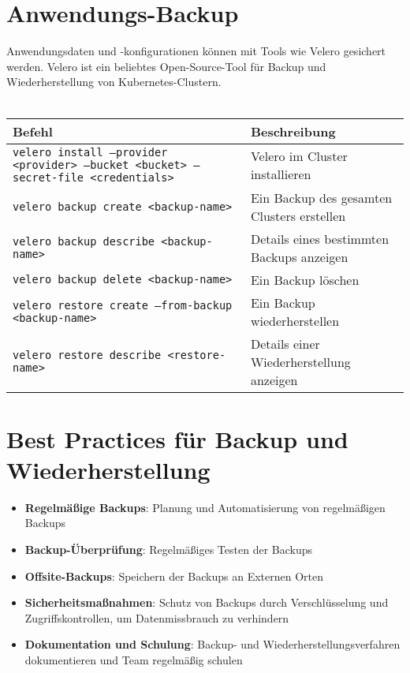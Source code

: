 \section{Anwendungs-Backup}
Anwendungsdaten und -konfigurationen können mit Tools wie Velero gesichert werden. Velero ist ein beliebtes Open-Source-Tool für Backup und Wiederherstellung von Kubernetes-Clustern.\\
\phantom{.}\\
\begin{tabular}{|p{}|p{}|}
\hline
\textbf{Befehl} & \textbf{Beschreibung} \\
\hline
\texttt{velero install --provider <provider> --bucket <bucket> --secret-file <credentials>} & Velero im Cluster installieren \\
\texttt{velero backup create <backup-name>} & Ein Backup des gesamten Clusters erstellen \\
\texttt{velero backup describe <backup-name>} & Details eines bestimmten Backups anzeigen \\
\texttt{velero backup delete <backup-name>} & Ein Backup löschen \\
\texttt{velero restore create --from-backup <backup-name>} & Ein Backup wiederherstellen \\
\texttt{velero restore describe <restore-name>} & Details einer Wiederherstellung anzeigen \\
\hline
\end{tabular}
\newpage
\section{Best Practices für Backup und Wiederherstellung}
\begin{itemize}
    \item \textbf{Regelmäßige Backups}: Planung und Automatisierung von regelmäßigen Backups
    \item \textbf{Backup-Überprüfung}: Regelmäßiges Testen der Backups
    \item \textbf{Offsite-Backups}: Speichern der Backups an Externen Orten
    \item \textbf{Sicherheitsmaßnahmen}: Schutz von Backups durch Verschlüsselung und Zugriffskontrollen, um Datenmissbrauch zu verhindern
    \item \textbf{Dokumentation und Schulung}: Backup- und Wiederherstellungsverfahren dokumentieren und Team regelmäßig schulen
\end{itemize}
